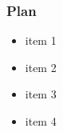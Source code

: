 \begin{frame}
    \frametitle{Plan}
    
    \begin{itemize}
    \item 
     item 1
        \item  item 2
        \item item 3
        \item item 4

    \end{itemize} 
\end{frame}

